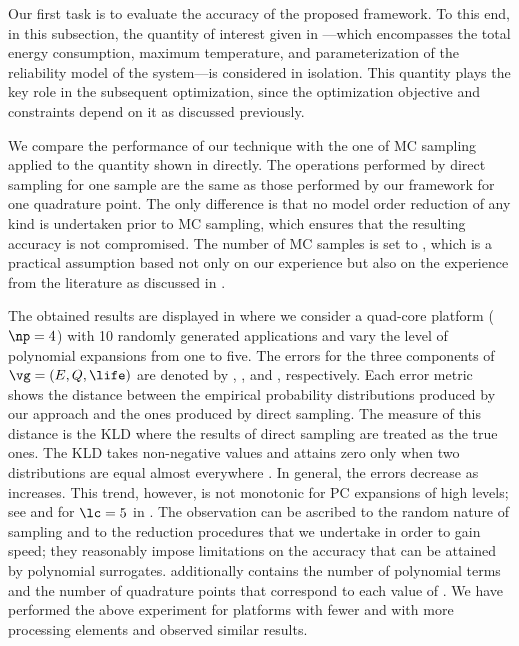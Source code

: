 Our first task is to evaluate the accuracy of the proposed framework. To this
end, in this subsection, the quantity of interest given in
---which encompasses the total energy
consumption, maximum temperature, and parameterization of the reliability model
of the system---is considered in isolation. This quantity plays the key role in
the subsequent optimization, since the optimization objective and constraints
depend on it as discussed previously.

We compare the performance of our technique with the one of \ac{MC} sampling
applied to the quantity shown in  directly.
The operations performed by direct sampling for one sample are the same as those
performed by our framework for one quadrature point. The only difference is that
no model order reduction of any kind is undertaken prior to \ac{MC} sampling,
which ensures that the resulting accuracy is not compromised. The number of
\ac{MC} samples is set to , which is a practical assumption based
not only on our experience but also on the experience from the literature as
discussed in .

The obtained results are displayed in  where
we consider a quad-core platform ($\np = 4$) with 10 randomly generated
applications and vary the level of polynomial expansions \lc from one to five.
The errors for the three components of $\vg = (E, Q, \life)$ are denoted by
, , and \error{\life}, respectively. Each error metric shows
the distance between the empirical probability distributions produced by our
approach and the ones produced by direct sampling. The measure of this distance
is the \ac{KLD} \cite{gelman2013, hastie2013} where the results of direct
sampling are treated as the true ones. The \ac{KLD} takes non-negative values
and attains zero only when two distributions are equal almost everywhere
\cite{durrett2010}. In general, the errors decrease as \lc increases. This
trend, however, is not monotonic for \ac{PC} expansions of high levels; see
 and \error{\life} for $\lc = 5$ in .
The observation can be ascribed to the random nature of sampling and to the
reduction procedures that we undertake in order to gain speed; they reasonably
impose limitations on the accuracy that can be attained by polynomial
surrogates.  additionally contains the number
of polynomial terms \nc and the number of quadrature points \nq that correspond
to each value of \lc. We have performed the above experiment for platforms with
fewer and with more processing elements and observed similar results.

